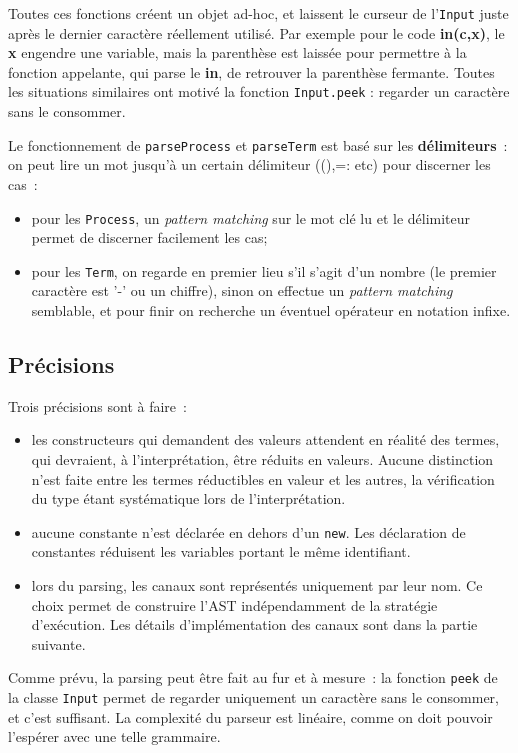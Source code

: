 \documentclass[11pt]{article} %
\begin{document}
Toutes ces fonctions créent un objet ad-hoc, et laissent le curseur de l'\texttt{Input} juste après le dernier caractère réellement utilisé. Par exemple pour le code \textbf{in(c,x)}, le \textbf{x} engendre une variable, mais la parenthèse est laissée pour permettre à la fonction appelante, qui parse le \textbf{in}, de retrouver la parenthèse fermante. Toutes les situations similaires ont motivé la fonction \texttt{Input.peek} : regarder un caractère sans le consommer.

Le fonctionnement de \texttt{parseProcess} et \texttt{parseTerm} est basé sur les \textbf{délimiteurs}~: on peut lire un mot jusqu'à un certain délimiteur ((),=: etc) pour discerner les cas~:
\begin{itemize}
\item pour les \texttt{Process}, un \emph{pattern matching} sur le mot clé lu et le délimiteur permet de discerner facilement les cas;
\item pour les \texttt{Term}, on regarde en premier lieu s'il s'agit d'un nombre (le premier caractère est '-' ou un chiffre), sinon on effectue un \emph{pattern matching} semblable, et pour finir on recherche un éventuel opérateur en notation infixe.
\end{itemize}

\subsection{Précisions}

Trois précisions sont à faire~:
\begin{itemize}
\item les constructeurs qui demandent des valeurs attendent en réalité des termes, qui devraient, à l'interprétation, être réduits en valeurs. Aucune distinction n'est faite entre les termes réductibles en valeur et les autres, la vérification du type étant systématique lors de l'interprétation.
\item aucune constante n'est déclarée en dehors d'un \texttt{new}. Les déclaration de constantes réduisent les variables portant le même identifiant.
\item lors du parsing, les canaux sont représentés uniquement par leur nom. Ce choix permet de construire l'AST indépendamment de la stratégie d'exécution. Les détails d'implémentation des canaux sont dans la partie suivante.
\end{itemize}

Comme prévu, la parsing peut être fait au fur et à mesure~: la fonction \texttt{peek} de la classe \texttt{Input} permet de regarder uniquement un caractère sans le consommer, et c'est suffisant. La complexité du parseur est linéaire, comme on doit pouvoir l'espérer avec une telle grammaire.
\end{document}
